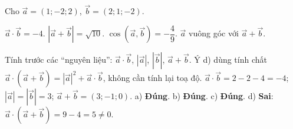 \begin{viduds}
Cho $\vec a=(1;-2;2)$, $\vec b=(2;1;-2)$.
\begin{dungsai}
  \y $\vec a\cdot\vec b=-4$. \oDS
  \y $|\vec a+\vec b|=\sqrt{10}$. \oDS
  \y $\cos(\vec a,\vec b)=-\dfrac49$. \oDS
  \y $\vec a$ vuông góc với $\vec a+\vec b$. \oDS
\end{dungsai}
\begin{loigiai}
\tuduy Tính trước các ``nguyên liệu'': $\vec a\cdot\vec b$, $|\vec a|$, $|\vec b|$, $\vec a+\vec b$. Ý d) dùng tính chất $\vec a\cdot(\vec a+\vec b)=|\vec a|^2+\vec a\cdot\vec b$, không cần tính lại toạ độ.
\giai $\vec a\cdot\vec b=2-2-4=-4$; $|\vec a|=|\vec b|=3$; $\vec a+\vec b=(3;-1;0)$. a) \textbf{Đúng}. b) \textbf{Đúng}. c) \textbf{Đúng}. d) \textbf{Sai}: $\vec a\cdot(\vec a+\vec b)=9-4=5\ne0$.
\end{loigiai}
\end{viduds}

